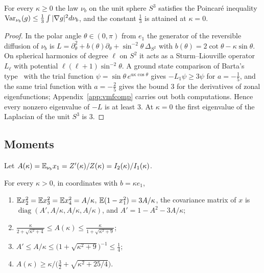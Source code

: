 \begin{lemma}\label{q-lem:vmf}
For every $\kappa\ge0$ the law $\nu_b$ on the unit sphere $S^3$ satisfies
the Poincar\'e inequality $\operatorname{Var}_{\nu_b}(g)\le\frac13\int|\nabla g|^2d\nu_b$,
and the constant $\frac13$ is attained at $\kappa=0$.
\end{lemma}

\begin{proof}
In the polar angle $\theta\in(0,\pi)$ from $e_1$ the generator of the
reversible diffusion of $\nu_b$ is $L=\partial_\theta^2+b(\theta)
\partial_\theta+\sin^{-2}\theta\,\Delta_{S^2}$ with $b(\theta)=2\cot\theta-
\kappa\sin\theta$. On spherical harmonics of degree $\ell$ on $S^2$ it acts as
a Sturm--Liouville operator $L_\ell$ with potential
$\ell(\ell+1)\sin^{-2}\theta$. A ground state comparison of Barta's
type~\cite{Bar37} with the trial function $\psi=\sin\theta\,
e^{a\kappa\cos\theta}$ gives $-L_1\psi\ge3\psi$ for $a=-\frac15$, and the same
trial function with $a=-\frac25$ gives the bound $3$ for the derivatives of
zonal eigenfunctions; Appendix~\ref{app:vmfcomp} carries out both computations.
Hence every nonzero eigenvalue of $-L$ is at least $3$. At $\kappa=0$ the
first eigenvalue of the Laplacian of the unit $S^3$ is $3$.
\end{proof}

\subsection{Moments}

Let $A(\kappa)=\mathbb{E}_{\nu_b}x_1=Z'(\kappa)/Z(\kappa)=I_2(\kappa)/I_1(\kappa)$.

\begin{lemma}\label{q-lem:moments}
For every $\kappa>0$, in coordinates with $b=\kappa e_1$,
\begin{enumerate}[label=\textup{(\roman*)},leftmargin=*]
\item $\mathbb{E} x_2^2=\mathbb{E} x_3^2=\mathbb{E} x_4^2=A/\kappa$, $\mathbb{E}(1-x_1^2)=3A/\kappa$, the
covariance matrix of $x$ is $\operatorname{diag}(A',A/\kappa,A/\kappa,
A/\kappa)$, and $A'=1-A^2-3A/\kappa$;
\item $\displaystyle\frac{\kappa}{2+\sqrt{\kappa^2+4}}\le
A(\kappa)\le\frac{\kappa}{1+\sqrt{\kappa^2+9}}$;
\item $A'\le A/\kappa\le\bigl(1+\sqrt{\kappa^2+9}\bigr)^{-1}\le\frac14$;
\item $A(\kappa)\ge\kappa\big/\bigl(\frac32+\sqrt{\kappa^2+25/4}\bigr)$.
\end{enumerate}
\end{lemma}

